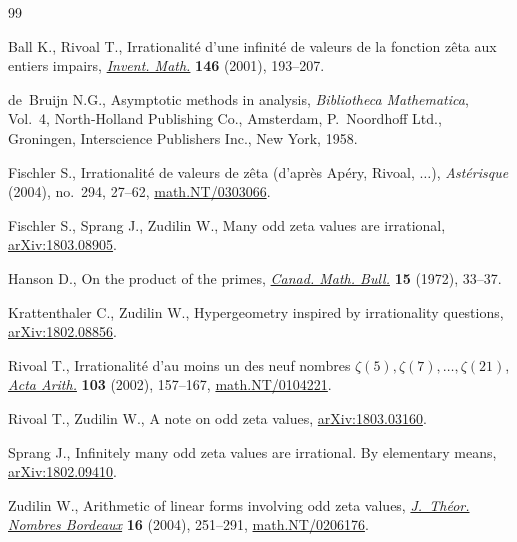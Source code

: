 \documentclass[pdftex]{sigma}
\begin{document}
\begin{thebibliography}{99}
\footnotesize\itemsep=0pt

Ball K., Rivoal T., Irrationalit\'e d'une infinit\'e de valeurs de la fonction
 z\^eta aux entiers impairs, \href{https://doi.org/10.1007/s002220100168}{\textit{Invent. Math.}} \textbf{146} (2001),
 193--207.

de~Bruijn N.G., Asymptotic methods in analysis, \textit{Bibliotheca
 Mathematica}, Vol.~4, North-Holland Publishing Co., Amsterdam, P.~Noordhoff
 Ltd., Groningen, Interscience Publishers Inc., New York, 1958.

Fischler S., Irrationalit\'e de valeurs de z\^eta (d'apr\`es {A}p\'ery,
 {R}ivoal, {$\dots$}), \textit{Ast\'erisque} (2004), no.~294, 27--62,
 \href{https://arxiv.org/abs/math.NT/0303066}{math.NT/0303066}.

Fischler S., Sprang J., Zudilin W., Many odd zeta values are irrational, \href{https://arxiv.org/abs/1803.08905}{arXiv:1803.08905}.

Hanson D., On the product of the primes, \href{https://doi.org/10.4153/CMB-1972-007-7}{\textit{Canad. Math. Bull.}}
 \textbf{15} (1972), 33--37.

Krattenthaler C., Zudilin W., Hypergeometry inspired by irrationality
 questions, \href{https://arxiv.org/abs/1802.08856}{arXiv:1802.08856}.

Rivoal T., Irrationalit\'e d'au moins un des neuf nombres
 {$\zeta(5),\zeta(7),\dots,\zeta(21)$}, \href{https://doi.org/10.4064/aa103-2-5}{\textit{Acta Arith.}} \textbf{103}
 (2002), 157--167, \href{https://arxiv.org/abs/math.NT/0104221}{math.NT/0104221}.

Rivoal T., Zudilin W., A note on odd zeta values, \href{https://arxiv.org/abs/1803.03160}{arXiv:1803.03160}.

Sprang J., Infinitely many odd zeta values are irrational. By elementary means,
 \href{https://arxiv.org/abs/1802.09410}{arXiv:1802.09410}.

Zudilin W., Arithmetic of linear forms involving odd zeta values,
 \href{https://doi.org/10.5802/jtnb.447}{\textit{J.~Th\'eor. Nombres Bordeaux}} \textbf{16} (2004), 251--291,
 \href{https://arxiv.org/abs/math.NT/0206176}{math.NT/0206176}.

\end{thebibliography}\LastPageEnding
\end{document}
